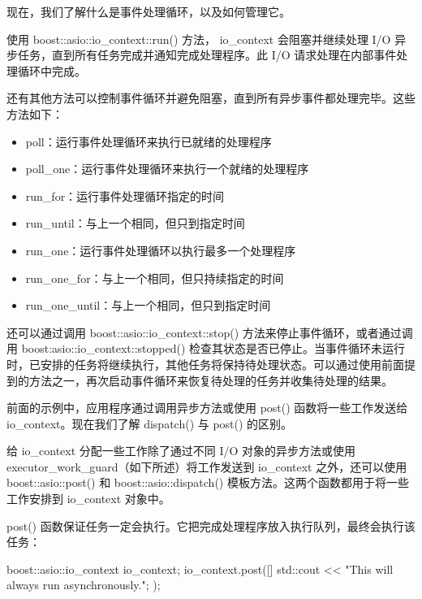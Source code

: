 现在，我们了解什么是事件处理循环，以及如何管理它。


使用 boost::asio::io\_context::run() 方法， io\_context 会阻塞并继续处理 I/O 异步任务，直到所有任务完成并通知完成处理程序。此 I/O 请求处理在内部事件处理循环中完成。

还有其他方法可以控制事件循环并避免阻塞，直到所有异步事件都处理完毕。这些方法如下：

\begin{itemize}
\item
poll：运行事件处理循环来执行已就绪的处理程序

\item
poll\_one：运行事件处理循环来执行一个就绪的处理程序

\item
run\_for：运行事件处理循环指定的时间

\item
run\_until：与上一个相同，但只到指定时间

\item
run\_one：运行事件处理循环以执行最多一个处理程序

\item
run\_one\_for：与上一个相同，但只持续指定的时间

\item
run\_one\_until：与上一个相同，但只到指定时间
\end{itemize}

还可以通过调用 boost::asio::io\_context::stop() 方法来停止事件循环，或者通过调用 boost:asio::io\_context::stopped() 检查其状态是否已停止。当事件循环未运行时，已安排的任务将继续执行，其他任务将保持待处理状态。可以通过使用前面提到的方法之一，再次启动事件循环来恢复待处理的任务并收集待处理的结果。

前面的示例中，应用程序通过调用异步方法或使用 post() 函数将一些工作发送给 io\_context。现在我们了解 dispatch() 与 post() 的区别。

给 io\_context 分配一些工作除了通过不同 I/O 对象的异步方法或使用 executor\_work\_guard（如下所述）将工作发送到 io\_context 之外，还可以使用 boost::asio::post() 和 boost::asio::dispatch() 模板方法。这两个函数都用于将一些工作安排到 io\_context 对象中。

post() 函数保证任务一定会执行。它把完成处理程序放入执行队列，最终会执行该任务：

\begin{cpp}
boost::asio::io_context io_context;
io_context.post([] {
    std::cout << "This will always run asynchronously.\n";
});
\end{cpp}

